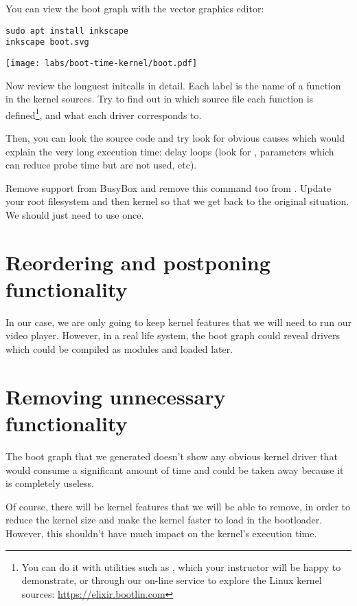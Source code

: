 You can view the boot graph with the  vector graphics
editor:

\begin{verbatim}
sudo apt install inkscape
inkscape boot.svg
\end{verbatim}

\begin{center}
\texttt{[image: labs/boot-time-kernel/boot.pdf]}
\end{center}

Now review the longuest initcalls in detail. Each label is the name of
a function in the kernel sources. Try to find out in which source file
each function is defined\footnote{You can do it with utilities such as
, which your instructor will be happy to demonstrate,
or through our on-line service to explore the Linux kernel sources:
\url{https://elixir.bootlin.com}}, and what each driver corresponds
to.

Then, you can look the source code and try look for obvious causes which
would explain the very long execution time: delay loops (look for
, parameters which can reduce probe time but are not used,
etc).

Remove  support from BusyBox and remove this command too
from . Update your root filesystem and then kernel so
that we get back to the original situation. We should just need to use
 once.

\section{Reordering and postponing functionality}

In our case, we are only going to keep kernel features that we will need
to run our video player. However, in a real life system, the boot graph
could reveal drivers which could be compiled as modules
and loaded later.

\section{Removing unnecessary functionality}

The boot graph that we generated doesn't show any obvious kernel
driver that would consume a significant amount of time and could be
taken away because it is completely useless.

Of course, there will be kernel features that we will be able to remove,
in order to reduce the kernel size and make the kernel faster to load
in the bootloader. However, this shouldn't have much impact on the
kernel's execution time.


